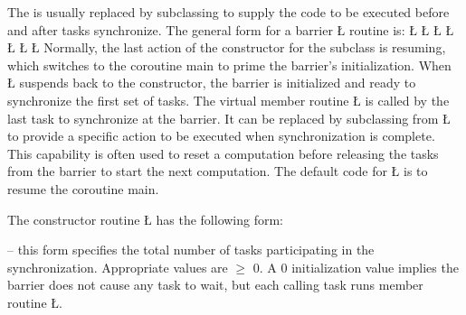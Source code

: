 \documentclass[openright,twoside]{report}
\begin{document}
The  is usually replaced by subclassing to supply the code to be executed before and after tasks synchronize.
The general form for a barrier \LGinlinetrue\LGbegin\lgrinde\L{}\endlgrinde\LGend{} routine is:
\LGinlinefalse\LGbegin\lgrinde
\L{}
\L{}
\L{\LB{}}
\CE{}\L{\LB{}}
\L{\LB{}}
\CE{}\L{\LB{}}
\L{\LB{\}}}
\endlgrinde\LGend
Normally, the last action of the constructor for the subclass is resuming, which switches to the coroutine main to prime the barrier's initialization.
When \LGinlinetrue\LGbegin\lgrinde\L{}\endlgrinde\LGend{} suspends back to the constructor, the barrier is initialized and ready to synchronize the first set of tasks.
The virtual member routine \LGinlinetrue\LGbegin\lgrinde\L{}\endlgrinde\LGend{} is called by the last task to synchronize at the barrier.
It can be replaced by subclassing from \LGinlinetrue\LGbegin\lgrinde\L{}\endlgrinde\LGend{} to provide a specific action to be executed when synchronization is complete.
This capability is often used to reset a computation before releasing the tasks from the barrier to start the next computation.
The default code for \LGinlinetrue\LGbegin\lgrinde\L{}\endlgrinde\LGend{} is to resume the coroutine main.

The constructor routine \LGinlinetrue\LGbegin\lgrinde\L{}\endlgrinde\LGend{} has the following form:
\begin{prefix}
\item[\LGinlinetrue\LGbegin\lgrinde\L{\LB{\V{uBarrier}(\0\K{unsigned}\0\K{int}\0\V{total}\0)}}\endlgrinde\LGend{}]
-- this form specifies the total number of tasks participating in the synchronization.
Appropriate values are $\geq$ 0.
A 0 initialization value implies the barrier does not cause any task to wait, but each calling task runs member routine \LGinlinetrue\LGbegin\lgrinde\L{}\endlgrinde\LGend{}.
\end{prefix}
\end{document}
